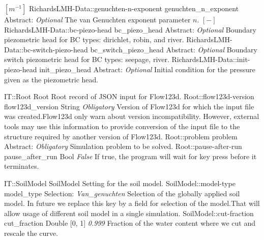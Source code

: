 \begin{RecordType}
{{{ }{$[m^{-1}]$}}}
		\RecKey
			{RichardsLMH-Data::genuchten-n-exponent}
			{genuchten{\_}n{\_}exponent}
			{{Abstract}{: }}
			{ \it{Optional} }
			{{{The van Genuchten exponent parameter }{$ n $}{. }{$[-]$}}}
		\RecKey
			{RichardsLMH-Data::bc-piezo-head}
			{bc{\_}piezo{\_}head}
			{{Abstract}{: }}
			{ \it{Optional} }
			{{{Boundary piezometric head for BC types: dirichlet, robin, and river.}}}
		\RecKey
			{RichardsLMH-Data::bc-switch-piezo-head}
			{bc{\_}switch{\_}piezo{\_}head}
			{{Abstract}{: }}
			{ \it{Optional} }
			{{{Boundary switch piezometric head for BC types: seepage, river.}}}
		\RecKey
			{RichardsLMH-Data::init-piezo-head}
			{init{\_}piezo{\_}head}
			{{Abstract}{: }}
			{ \it{Optional} }
			{{{Initial condition for the pressure given as the piezometric head.}}}
\end{RecordType}
\begin{RecordType}
	{IT::Root}
	{Root}
	{} %
	{} %
	{{{Root record of JSON input for Flow123d.}}}
		\RecKey
			{Root::flow123d-version}
			{flow123d{\_}version}
			{{String}}
			{ \it{Obligatory} }
			{{{Version of Flow123d for which the input file was created.Flow123d only warn about version incompatibility. However, external tools may use this information to provide conversion of the input file to the structure required by another version of Flow123d.}}}
		\RecKey
			{Root::problem}
			{problem}
			{{Abstract}{: }}
			{ \it{Obligatory} }
			{{{Simulation problem to be solved.}}}
		\RecKey
			{Root::pause-after-run}
			{pause{\_}after{\_}run}
			{{Bool}}
			{ \it{False} }
			{{{If true, the program will wait for key press before it terminates.}}}
\end{RecordType}
\begin{RecordType}
	{IT::SoilModel}
	{SoilModel}
	{} %
	{} %
	{{{Setting for the soil model.}}}
		\RecKey
			{SoilModel::model-type}
			{model{\_}type}
			{{Selection}{: }}
			{ \it{Van{\_}genuchten} }
			{{{Selection of the globally applied soil model. In future we replace this key by a field for selection of the model.That will allow usage of different soil model in a single simulation.}}}
		\RecKey
			{SoilModel::cut-fraction}
			{cut{\_}fraction}
			{{Double [0, 1]}}
			{ \it{0.999} }
			{{{Fraction of the water content where we cut  and rescale the curve.}}}
\end{RecordType}
